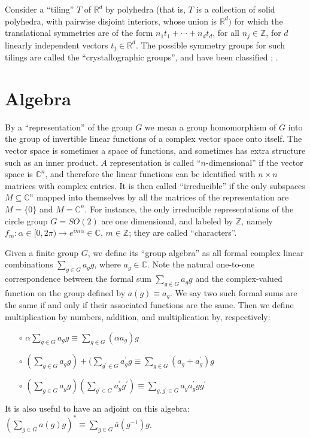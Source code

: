 \documentclass[reqno]{stml-l}
\theoremstyle{plain}
\theoremstyle{definition}
\numberwithin{equation}{chapter}
\begin{document}
Consider a ``tiling'' $T$ of $\mathbb{R}^{d}$ by polyhedra (that is, $T$ is a collection of solid polyhedra, with pairwise disjoint interiors, whose union is $\mathbb{R}^{d})$ for which the translational symmetries are of the form $n_{1}t_{1}+\cdots+n_{d}t_{d}$, for all $n_{j}\in \mathbb{Z}$, for $d$ linearly independent vectors $t_{j}\in \mathbb{R}^{d}$. The possible symmetry groups for such tilings are called the ``crystallographic groups'', and have been classified \cite[p. 81]{bib:HiC}; \cite[p. 189]{bib:NiS}.


\chapter{Algebra}\label{appII:appII}

By a ``representation'' of the group $G$ we mean a group homomorphism of $G$ into the group of invertible linear functions of a complex vector space onto itself. The vector space is sometimes a space of functions, and sometimes has extra structure such as an inner product. $A$ representation is called ``$n$-dimensional'' if the vector space is $\mathbb{C}^{n}$, and therefore the linear functions can be identified with $n \times n$ matrices with complex entries. It is then called ``irreducible'' if the only subspaces $M\subseteq \mathbb{C}^{n}$ mapped into themselves by all the matrices of the representation are $M=\{0\}$ and $M=\mathbb{C}^{n}$. For instance, the only irreducible representations of the circle group $G=SO(2)$ are one dimensional, and labeled by $\mathbb{Z}$, namely $f_{m}:\alpha\in[0,2\pi)\rightarrow e^{im\alpha}\in \mathbb{C},\,m\in \mathbb{Z}$; they are called ``characters''.

Given a finite group $G$, we define its ``group algebra'' as all formal complex linear combinations $\sum\nolimits_{g\in G}a_{g}g$, where $a_{g}\in \mathbb{C}$. Note the natural one-to-one correspondence between the formal sum $\sum\nolimits_{g\in G}a_{g}g$ and the complex-valued function on the group defined by $a(g)\equiv a_{g}$. We say two such formal sums are the same if and only if their associated functions are the same. Then we define multiplication by numbers, addition, and multiplication by, respectively:
\begin{enumerate}
\item[$\circ$] $\alpha\sum\nolimits_{g\in G}a_{g}g\equiv\sum\nolimits_{g\in G}(\alpha a_{g})g$
\item[$\circ$] $(\sum\nolimits_{g\in G}a_{g}g)+(\sum\nolimits_{g^{\prime}\in G}a_{g}^{\prime}g\equiv\sum\nolimits_{g\in G}(a_{g}+a_{g}^{\prime})g$
\item[$\circ$] $(\sum\nolimits_{g\in G}a_{g}g)(\sum\nolimits_{g^{\prime}\in G}a_{g}^{\prime}g^{\prime})\equiv\sum\limits_{g,g^{\prime}\in G}a_{g}a_{g}^{\prime}gg^{\prime}$
\end{enumerate}
It is also useful to have an adjoint on this algebra: $(\sum\nolimits_{g\in G}a(g)g)^{\ast}\equiv \sum\nolimits_{g\in G}\bar{a}(g^{-1})g$.
\end{document}
